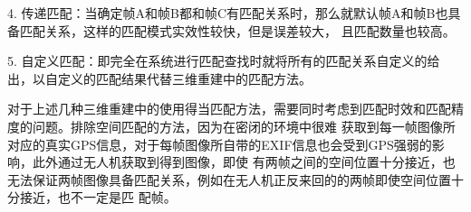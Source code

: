 4.  传递匹配：当确定帧A和帧B都和帧C有匹配关系时，那么就默认帧A和帧B也具备匹配关系，这样的匹配模式实效性较快，但是误差较大，
且匹配数量也较高。

5.  自定义匹配：即完全在系统进行匹配查找时就将所有的匹配关系自定义的给出，以自定义的匹配结果代替三维重建中的匹配方法。

对于上述几种三维重建中的使用得当匹配方法，需要同时考虑到匹配时效和匹配精度的问题。排除空间匹配的方法，因为在密闭的环境中很难
获取到每一帧图像所对应的真实GPS信息，对于每帧图像所自带的EXIF信息也会受到GPS强弱的影响，此外通过无人机获取到得到图像，即使
有两帧之间的空间位置十分接近，也无法保证两帧图像具备匹配关系，例如在无人机正反来回的的两帧即使空间位置十分接近，也不一定是匹
配帧。


